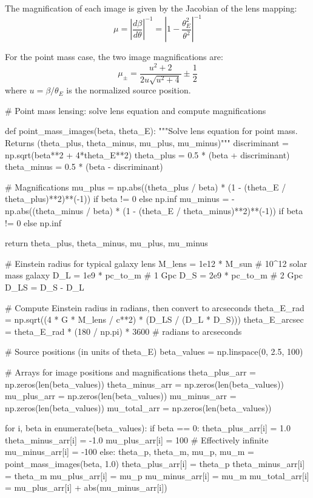 \documentclass[11pt,a4paper]{article}
\begin{document}
The magnification of each image is given by the Jacobian of the lens mapping:
\begin{equation}
\mu = \left|\frac{d\beta}{d\theta}\right|^{-1} = \left|1 - \frac{\theta_E^2}{\theta^2}\right|^{-1}
\end{equation}

For the point mass case, the two image magnifications are:
\begin{equation}
\mu_\pm = \frac{u^2 + 2}{2u\sqrt{u^2 + 4}} \pm \frac{1}{2}
\end{equation}
where $u = \beta/\theta_E$ is the normalized source position.

\begin{pycode}
# Point mass lensing: solve lens equation and compute magnifications

def point_mass_images(beta, theta_E):
    """Solve lens equation for point mass. Returns (theta_plus, theta_minus, mu_plus, mu_minus)"""
    discriminant = np.sqrt(beta**2 + 4*theta_E**2)
    theta_plus = 0.5 * (beta + discriminant)
    theta_minus = 0.5 * (beta - discriminant)

    # Magnifications
    mu_plus = np.abs((theta_plus / beta) * (1 - (theta_E / theta_plus)**2)**(-1)) if beta != 0 else np.inf
    mu_minus = -np.abs((theta_minus / beta) * (1 - (theta_E / theta_minus)**2)**(-1)) if beta != 0 else np.inf

    return theta_plus, theta_minus, mu_plus, mu_minus

# Einstein radius for typical galaxy lens
M_lens = 1e12 * M_sun  # 10^12 solar mass galaxy
D_L = 1e9 * pc_to_m  # 1 Gpc
D_S = 2e9 * pc_to_m  # 2 Gpc
D_LS = D_S - D_L

# Compute Einstein radius in radians, then convert to arcseconds
theta_E_rad = np.sqrt((4 * G * M_lens / c**2) * (D_LS / (D_L * D_S)))
theta_E_arcsec = theta_E_rad * (180 / np.pi) * 3600  # radians to arcseconds

# Source positions (in units of theta_E)
beta_values = np.linspace(0, 2.5, 100)

# Arrays for image positions and magnifications
theta_plus_arr = np.zeros(len(beta_values))
theta_minus_arr = np.zeros(len(beta_values))
mu_plus_arr = np.zeros(len(beta_values))
mu_minus_arr = np.zeros(len(beta_values))
mu_total_arr = np.zeros(len(beta_values))

for i, beta in enumerate(beta_values):
    if beta == 0:
        theta_plus_arr[i] = 1.0
        theta_minus_arr[i] = -1.0
        mu_plus_arr[i] = 100  # Effectively infinite
        mu_minus_arr[i] = -100
    else:
        theta_p, theta_m, mu_p, mu_m = point_mass_images(beta, 1.0)
        theta_plus_arr[i] = theta_p
        theta_minus_arr[i] = theta_m
        mu_plus_arr[i] = mu_p
        mu_minus_arr[i] = mu_m
    mu_total_arr[i] = mu_plus_arr[i] + abs(mu_minus_arr[i])


\end{pycode}
\end{document}
